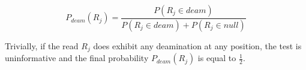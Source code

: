 \documentclass[a4paper,12pt]{article}
\begin{document}
\begin{equation}
P_{deam}(R_j) = \frac {P (R_j \in deam)} {P(R_j \in deam) +  P(R_j \in null)}
\end{equation}

\noindent Trivially, if the read $R_j$ does exhibit any deamination at any position, the test is uninformative and the final probability $P_{deam}(R_j)$ is equal to $\frac {1} {2}$.





\end{document}
